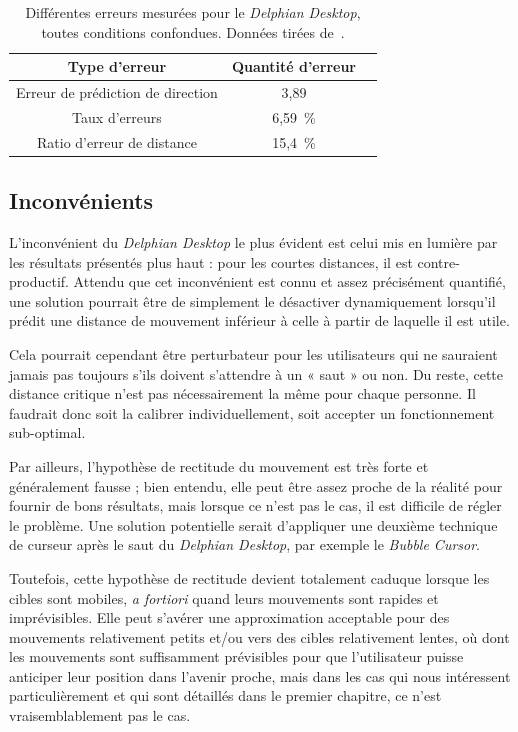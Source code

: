 	\begin{table}
	\centering
	\begin{tabular}{c | c c }
		Type d'erreur						& Quantité d'erreur	\bigstrut[b] \\ \hline
		Erreur de prédiction de direction	& 3,89\textdegree	\bigstrut[t] \\
		Taux d'erreurs						& 6,59~\%{}			\\
		Ratio d'erreur de distance			& 15,4~\%{}			\\
	\end{tabular}
	\caption[\emph{Delphian Desktop} --- Erreurs]{Différentes erreurs mesurées pour le \emph{Delphian Desktop}, toutes conditions confondues. Données tirées de~\cite{asano2005predictive}.}
	\label{tab:delphianErrors}
	\end{table}
	
	\subsection{Inconvénients}
	L'inconvénient du \emph{Delphian Desktop} le plus évident est celui mis en lumière par les résultats présentés plus haut : pour les courtes distances, il est contre-productif. Attendu que cet inconvénient est connu et assez précisément quantifié, une solution pourrait être de simplement le désactiver dynamiquement lorsqu'il prédit une distance de mouvement inférieur à celle à partir de laquelle il est utile.
	
	Cela pourrait cependant être perturbateur pour les utilisateurs qui ne sauraient jamais pas toujours s'ils doivent s'attendre à un « saut » ou non. Du reste, cette distance critique n'est pas nécessairement la même pour chaque personne. Il faudrait donc soit la calibrer individuellement, soit accepter un fonctionnement sub-optimal.
	
	Par ailleurs, l'hypothèse de rectitude du mouvement est très forte et généralement fausse ; bien entendu, elle peut être assez proche de la réalité pour fournir de bons résultats, mais lorsque ce n'est pas le cas, il est difficile de régler le problème. Une solution potentielle serait d'appliquer une deuxième technique de curseur après le saut du \emph{Delphian Desktop}, par exemple le \emph{Bubble Cursor}.
	
	Toutefois, cette hypothèse de rectitude devient totalement caduque lorsque les cibles sont mobiles, \emph{a fortiori} quand leurs mouvements sont rapides et imprévisibles. Elle peut s'avérer une approximation acceptable pour des mouvements relativement petits et/ou vers des cibles relativement lentes, où dont les mouvements sont suffisamment prévisibles pour que l'utilisateur puisse anticiper leur position dans l'avenir proche, mais dans les cas qui nous intéressent particulièrement et qui sont détaillés dans le premier chapitre, ce n'est vraisemblablement pas le cas.
	
